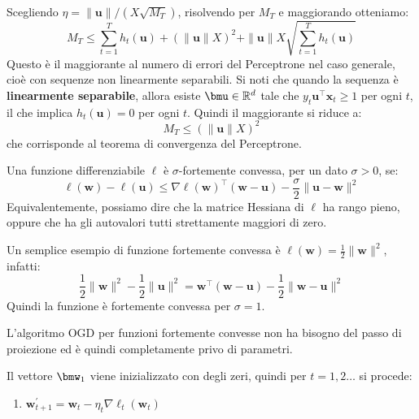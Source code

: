 \documentclass[\main/main.tex]{subfiles}
\begin{document}
\begin{analysis}
    Scegliendo \(\eta=\|\boldsymbol{u}\| /\left(X \sqrt{M_{T}}\right)\), risolvendo per \(M_T\) e maggiorando otteniamo:
    \[
        M_{T} \leq \sum_{t=1}^{T} h_{t}(\boldsymbol{u})+(\|\boldsymbol{u}\| X)^{2}+\|\boldsymbol{u}\| X \sqrt{\sum_{t=1}^{T} h_{t}(\boldsymbol{u})}
    \]
    Questo è il maggiorante al numero di errori del Perceptrone nel caso generale, cioè con sequenze non linearmente separabili. Si noti che quando la sequenza è \textbf{linearmente separabile}, allora esiste \(\bmu \in \R^d\) tale che \(y_{t} \boldsymbol{u}^{\top} \boldsymbol{x}_{t} \geq 1\) per ogni \(t\), il che implica \(h_{t}(\boldsymbol{u})=0\) per ogni \(t\). Quindi il maggiorante si riduce a:
    \[M_{T} \leq(\|\boldsymbol{u}\| X)^{2}\]
    che corrisponde al teorema di convergenza del Perceptrone.
\end{analysis}
\begin{multicols}{2}
    \begin{definition}
        Una funzione differenziabile \(\ell\) è \(\sigma\)-fortemente convessa, per un dato \(\sigma>0\), se:
        \[\ell(\boldsymbol{w})-\ell(\boldsymbol{u}) \leq \nabla \ell(\boldsymbol{w})^{\top}(\boldsymbol{w}-\boldsymbol{u})-\frac{\sigma}{2}\|\boldsymbol{u}-\boldsymbol{w}\|^{2}\]
        Equivalentemente, possiamo dire che la matrice Hessiana di \(\ell\) ha rango pieno, oppure che ha gli autovalori tutti strettamente maggiori di zero.
    \end{definition}
    \begin{example}
        Un semplice esempio di funzione fortemente convessa è \(\ell(\boldsymbol{w})=\frac{1}{2}\|\boldsymbol{w}\|^{2}\), infatti:
        \[\frac{1}{2}\|\boldsymbol{w}\|^{2}-\frac{1}{2}\|\boldsymbol{u}\|^{2}=\boldsymbol{w}^{\top}(\boldsymbol{w}-\boldsymbol{u})-\frac{1}{2}\|\boldsymbol{w}-\boldsymbol{u}\|^{2}\]
        Quindi la funzione è fortemente convessa per \(\sigma = 1\).
    \end{example}
    \begin{observation}
        L'algoritmo OGD per funzioni fortemente convesse non ha bisogno del passo di proiezione ed è quindi completamente privo di parametri.
    \end{observation}
    \begin{definition}
        Il vettore \(\bmw_1\) viene inizializzato con degli zeri, quindi per \(t=1,2\ldots\) si procede:
        \begin{enumerate}
            \item \(\boldsymbol{w}_{t+1}^{\prime}=\boldsymbol{w}_{t}-\eta_t \nabla \ell_{t}\left(\boldsymbol{w}_{t}\right)\)
        \end{enumerate}
    \end{definition}
\end{multicols}
\end{document}
